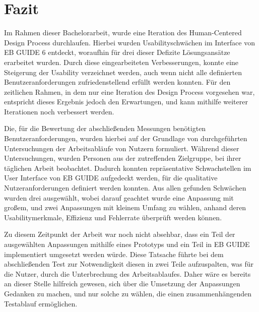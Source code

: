 \chapter{Fazit}\label{ch:summary}

Im Rahmen dieser Bachelorarbeit, wurde eine Iteration des Human-Centered Design Process durchlaufen.
Hierbei wurden Usabilityschwächen im Interface von EB GUIDE 6 entdeckt, woraufhin für drei dieser Defizite Lösungsansätze erarbeitet wurden.
Durch diese eingearbeiteten Verbesserungen, konnte eine Steigerung der Usability verzeichnet werden, auch wenn nicht alle definierten Benutzeranforderungen zufriedenstellend erfüllt werden konnten.
Für den zeitlichen Rahmen, in dem nur eine Iteration des Design Process vorgesehen war, entspricht dieses Ergebnis jedoch den Erwartungen, und kann mithilfe weiterer Iterationen noch verbessert werden.

Die, für die Bewertung der abschließenden Messungen benötigten Benutzeranforderungen, wurden hierbei auf der Grundlage von durchgeführten Untersuchungen der Arbeitsabläufe von Nutzern formuliert.
Während dieser Untersuchungen, wurden Personen aus der zutreffenden Zielgruppe, bei ihrer täglichen Arbeit beobachtet.
Dadurch konnten repräsentative Schwachstellen im User Interface von EB GUIDE aufgedeckt werden, für die qualitative Nutzeranforderungen definiert werden konnten.
Aus allen gefunden Schwächen wurden drei ausgewählt, wobei darauf geachtet wurde eine Anpassung mit großem, und zwei Anpassungen mit kleinem Umfang zu wählen, anhand deren Usabilitymerkmale, Effizienz und Fehlerrate überprüft werden können.

Zu diesem Zeitpunkt der Arbeit war noch nicht absehbar, dass ein Teil der ausgewählten Anpassungen mithilfe eines Prototyps und ein Teil in EB GUIDE implementiert umgesetzt werden würde.
Diese Tatsache führte bei dem abschließenden Test zur Notwendigkeit diesen in zwei Teile aufzuspalten, was für die Nutzer, durch die Unterbrechung des Arbeitsablaufes.
Daher wäre es bereits an dieser Stelle hilfreich gewesen, sich über die Umsetzung der Anpassungen Gedanken zu machen, und nur solche zu wählen, die einen zusammenhängenden Testablauf ermöglichen.

